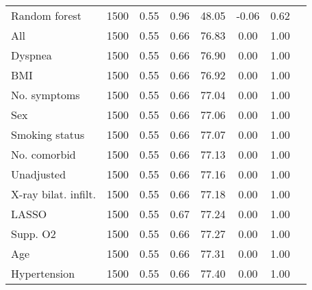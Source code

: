 \documentclass{article}
\begin{document}
{\begin{longtable}{lccccccc}
Random forest & 1500 & 0.55 & 0.96 &  48.05 & -0.06 & 0.62 \\ 
All & 1500 & 0.55 & 0.66 &  76.83 &  0.00 & 1.00 \\ 
Dyspnea & 1500 & 0.55 & 0.66 &  76.90 &  0.00 & 1.00 \\ 
BMI & 1500 & 0.55 & 0.66 &  76.92 &  0.00 & 1.00 \\ 
No. symptoms & 1500 & 0.55 & 0.66 &  77.04 &  0.00 & 1.00 \\ 
Sex & 1500 & 0.55 & 0.66 &  77.06 &  0.00 & 1.00 \\ 
Smoking status & 1500 & 0.55 & 0.66 &  77.07 &  0.00 & 1.00 \\ 
No. comorbid & 1500 & 0.55 & 0.66 &  77.13 &  0.00 & 1.00 \\ 
Unadjusted & 1500 & 0.55 & 0.66 &  77.16 &  0.00 & 1.00 \\ 
X-ray bilat. infilt. & 1500 & 0.55 & 0.66 &  77.18 &  0.00 & 1.00 \\ 
LASSO & 1500 & 0.55 & 0.67 &  77.24 &  0.00 & 1.00 \\ 
Supp. O2 & 1500 & 0.55 & 0.66 &  77.27 &  0.00 & 1.00 \\ 
Age & 1500 & 0.55 & 0.66 &  77.31 &  0.00 & 1.00 \\ 
Hypertension & 1500 & 0.55 & 0.66 &  77.40 &  0.00 & 1.00 \\
\bottomrule
\hline
\end{longtable}
}

\clearpage
\end{document}

